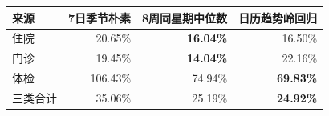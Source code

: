 \begin{tabular}{lrrr}
\toprule
来源 & 7日季节朴素 & 8周同星期中位数 & 日历趋势岭回归 \\
\midrule
住院 & 20.65\% & \textbf{16.04\%} & 16.50\% \\
门诊 & 19.45\% & \textbf{14.04\%} & 22.16\% \\
体检 & 106.43\% & 74.94\% & \textbf{69.83\%} \\
三类合计 & 35.06\% & 25.19\% & \textbf{24.92\%} \\
\bottomrule
\end{tabular}
